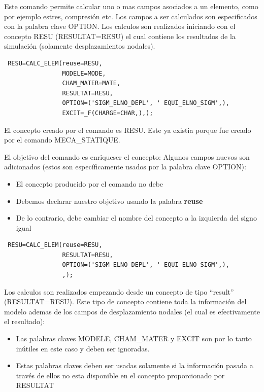 \documentclass[12pt]{book}
\theoremstyle{definition}
\theoremstyle{remark}
\theoremstyle{plain}
\begin{document}
Este comando permite calcular uno o mas campos asociados a un elemento, como por 
ejemplo estres, compresión etc. Los campos a ser calculados son especificados 
con la palabra clave OPTION. Los calculos son realizados iniciando con el concepto
RESU (RESULTAT=RESU) el cual contiene los resultados de la simulación (solamente 
desplazamientos nodales).
\begin{verbatim}
 RESU=CALC_ELEM(reuse=RESU,
                MODELE=MODE,
                CHAM_MATER=MATE,
                RESULTAT=RESU,
                OPTION=('SIGM_ELNO_DEPL', ' EQUI_ELNO_SIGM',),
                EXCIT=_F(CHARGE=CHAR,),);
\end{verbatim} 
El concepto creado por el comando es RESU. Este ya existia porque fue creado por el
comando MECA\_STATIQUE.

El objetivo del comando es enriqueser el concepto: Algunos campos nuevos son 
adicionados (estos son específicamente usados por la palabra clave OPTION):
\begin{itemize}
 \item El concepto producido por el comando no debe 
 \item Debemos declarar nuestro objetivo usando la palabra \textbf{reuse}
 \item De lo contrario, debe cambiar el nombre del concepto a la izquierda del
signo igual
\end{itemize}

\begin{verbatim}
 RESU=CALC_ELEM(reuse=RESU,
                RESULTAT=RESU,
                OPTION=('SIGM_ELNO_DEPL', ' EQUI_ELNO_SIGM',),
                ,);
\end{verbatim} 

Los calculos son realizados empezando desde un concepto de tipo ``result'' (RESULTAT=RESU).
Este tipo de concepto contiene toda la información del modelo ademas de los
campos de desplazamiento nodales (el cual es efectivamente el resultado):

\begin{itemize}
 \item Las palabras claves MODELE, CHAM\_MATER y EXCIT son por lo tanto inútiles
en este caso y deben ser ignoradas.
 \item Estas palabras claves deben ser usadas solamente si la información pasada
a través de ellos no esta disponible en el concepto proporcionado por RESULTAT
\end{itemize}
\end{document}
